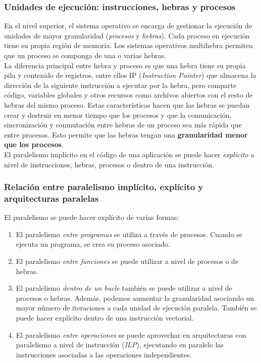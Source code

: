 \documentclass[12pt,spanish]{article}
\begin{document}
\subsubsection{Unidades de ejecución: instrucciones, hebras y procesos}

En el nivel superior, el sistema operativo se encarga de gestionar la ejecución de unidades de mayor granularidad (\textit{procesos} y \textit{hebras}). Cada proceso en ejecución tiene su propia región de memoria. Los sistemas operativos multihebra permiten que un proceso se componga de una o varias hebras.\\
La diferencia principal entre hebra y proceso es que una hebra tiene su propia pila y contenido de registros, entre ellos IP (\textit{Instruction Pointer}) que almacena la dirección de la siguiente instrucción a ejecutar por la hebra, pero comparte código, variables globales y otros recursos como archivos abiertos con el resto de hebras del mismo proceso. Estas características hacen que las hebras se puedan crear y destruir en menor tiempo que los procesos y que la comunicación, sincronización y conmutación entre hebras de un proceso sea más rápida que entre procesos. Esto permite que las hebras tengan una \textbf{granularidad menor que los procesos}.\\
El paralelismo implícito en el código de una aplicación se puede hacer \emph{explícito} a nivel de instrucciones, hebras, procesos o dentro de una instrucción.
\newpage
\subsubsection{Relación entre paralelismo implícito, explícito y arquitecturas paralelas}

El paralelismo se puede hacer explícito de varias formas:
\begin{enumerate}
\item El paralelismo \emph{entre programas} se utiliza a través de procesos. Cuando se ejecuta un programa, se crea su proceso asociado.
\item El paralelismo \emph{entre funciones} se puede utilizar a nivel de procesos o de hebras.
\item El paralelismo \emph{dentro de un bucle} también se puede utilizar a nivel de procesos o hebras. Además, podemos aumentar la granularidad asociando un mayor número de iteraciones a cada unidad de ejecución paralela. También se puede hacer explícito dentro de una instrucción vectorial.
\item El paralelismo \emph{entre operaciones} se puede aprovechar en arquitecturas con paralelismo a nivel de instrucción (\textit{ILP}), ejecutando en paralelo las instrucciones asociadas a las operaciones independientes.
\end{enumerate}
\end{document}
